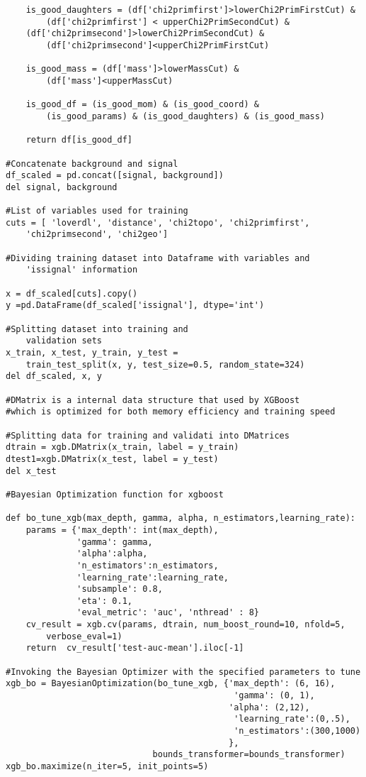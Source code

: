 \begin{lstlisting}
    is_good_daughters = (df['chi2primfirst']>lowerChi2PrimFirstCut) & 
        (df['chi2primfirst'] < upperChi2PrimSecondCut) & 
    (df['chi2primsecond']>lowerChi2PrimSecondCut) &
        (df['chi2primsecond']<upperChi2PrimFirstCut)
        
    is_good_mass = (df['mass']>lowerMassCut) &
        (df['mass']<upperMassCut)
        
    is_good_df = (is_good_mom) & (is_good_coord) &
        (is_good_params) & (is_good_daughters) & (is_good_mass)

    return df[is_good_df]

#Concatenate background and signal
df_scaled = pd.concat([signal, background])
del signal, background

#List of variables used for training
cuts = [ 'loverdl', 'distance', 'chi2topo', 'chi2primfirst', 
    'chi2primsecond', 'chi2geo'] 

#Dividing training dataset into Dataframe with variables and
    'issignal' information
    
x = df_scaled[cuts].copy()
y =pd.DataFrame(df_scaled['issignal'], dtype='int')

#Splitting dataset into training and 
    validation sets
x_train, x_test, y_train, y_test =
    train_test_split(x, y, test_size=0.5, random_state=324)
del df_scaled, x, y

#DMatrix is a internal data structure that used by XGBoost 
#which is optimized for both memory efficiency and training speed
    
#Splitting data for training and validati into DMatrices
dtrain = xgb.DMatrix(x_train, label = y_train)
dtest1=xgb.DMatrix(x_test, label = y_test)
del x_test

#Bayesian Optimization function for xgboost

def bo_tune_xgb(max_depth, gamma, alpha, n_estimators,learning_rate):
    params = {'max_depth': int(max_depth),
              'gamma': gamma,
              'alpha':alpha,
              'n_estimators':n_estimators,
              'learning_rate':learning_rate,
              'subsample': 0.8,
              'eta': 0.1,
              'eval_metric': 'auc', 'nthread' : 8}
    cv_result = xgb.cv(params, dtrain, num_boost_round=10, nfold=5, 
        verbose_eval=1)
    return  cv_result['test-auc-mean'].iloc[-1]

#Invoking the Bayesian Optimizer with the specified parameters to tune
xgb_bo = BayesianOptimization(bo_tune_xgb, {'max_depth': (6, 16),
                                             'gamma': (0, 1),
                                            'alpha': (2,12),
                                             'learning_rate':(0,.5),
                                             'n_estimators':(300,1000)
                                            },
                             bounds_transformer=bounds_transformer)
xgb_bo.maximize(n_iter=5, init_points=5)


\end{lstlisting}
